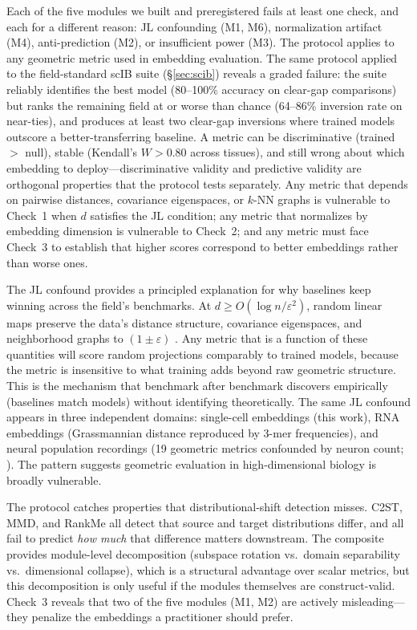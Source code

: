 \documentclass[10pt,letterpaper]{article}
\begin{document}
Each of the five modules we built and preregistered fails at least one check, and each for a different reason: JL confounding (M1, M6), normalization artifact (M4), anti-prediction (M2), or insufficient power (M3). The protocol applies to any geometric metric used in embedding evaluation. The same protocol applied to the field-standard scIB suite (\S\ref{sec:scib}) reveals a graded failure: the suite reliably identifies the best model (80--100\% accuracy on clear-gap comparisons) but ranks the remaining field at or worse than chance (64--86\% inversion rate on near-ties), and produces at least two clear-gap inversions where trained models outscore a better-transferring baseline. A metric can be discriminative (trained $>$ null), stable (Kendall's $W > 0.80$ across tissues), and still wrong about which embedding to deploy---discriminative validity and predictive validity are orthogonal properties that the protocol tests separately. Any metric that depends on pairwise distances, covariance eigenspaces, or $k$-NN graphs is vulnerable to Check~1 when $d$ satisfies the JL condition; any metric that normalizes by embedding dimension is vulnerable to Check~2; and any metric must face Check~3 to establish that higher scores correspond to better embeddings rather than worse ones.

The JL confound provides a principled explanation for why baselines keep winning across the field's benchmarks. At $d \geq O(\log n / \varepsilon^2)$, random linear maps preserve the data's distance structure, covariance eigenspaces, and neighborhood graphs to $(1 \pm \varepsilon)$ \citep{johnsonlindenstrauss1984}. Any metric that is a function of these quantities will score random projections comparably to trained models, because the metric is insensitive to what training adds beyond raw geometric structure. This is the mechanism that benchmark after benchmark discovers empirically (baselines match models) without identifying theoretically. The same JL confound appears in three independent domains: single-cell embeddings (this work), RNA embeddings (Grassmannian distance reproduced by 3-mer frequencies), and neural population recordings (19 geometric metrics confounded by neuron count; \citealp{tower2026bracket}). The pattern suggests geometric evaluation in high-dimensional biology is broadly vulnerable.

The protocol catches properties that distributional-shift detection misses. C2ST, MMD, and RankMe all detect that source and target distributions differ, and all fail to predict \emph{how much} that difference matters downstream. The composite provides module-level decomposition (subspace rotation vs.\ domain separability vs.\ dimensional collapse), which is a structural advantage over scalar metrics, but this decomposition is only useful if the modules themselves are construct-valid. Check~3 reveals that two of the five modules (M1, M2) are actively misleading---they penalize the embeddings a practitioner should prefer.
\end{document}
